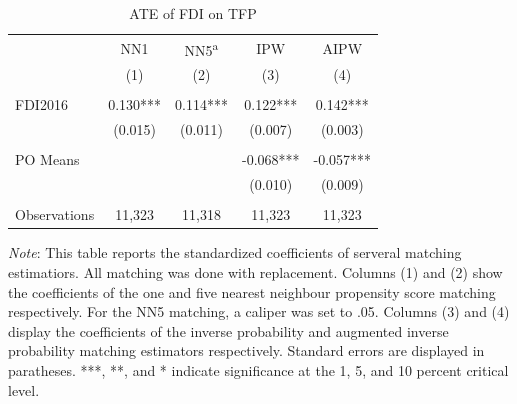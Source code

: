 \documentclass[a4paper,11pt]{scrartcl}
\begin{document}
\begin{table}[h!]
 	\centering
   	\caption{ATE of FDI on TFP}
   	\label{tab:mainresults}
\begin{threeparttable}
	
 \begin{tabular}{l*{4}{c}}
	\hline
	\hline
 			& NN1 & NN5\textsuperscript{a} & IPW & AIPW \\
 			& (1) & (2) & (3)  & (4) \\ \hline
 			&  &  &  &    \\
FDI2016 	& 0.130*** & 0.114*** & 0.122***  & 0.142***   \\
 			& (0.015) & (0.011) & (0.007) &   (0.003)  \\
 	&  &  &  &    \\
PO Means 	& & & -0.068*** &  -0.057*** \\
			&  &  & (0.010)  &  (0.009) \\
			&  &  &  &    \\
 Observations & 11,323 & 11,318 & 11,323 & 11,323 \\ 
 	\hline
 	\hline 
\end{tabular}

\begin{tablenotes}[flushleft]
      \footnotesize
\item \textit{Note}: %
This table reports the standardized coefficients of serveral matching estimatiors. All matching was done with replacement. Columns (1) and (2) show the coefficients of the one and five nearest neighbour propensity score matching respectively. For the NN5 matching, a caliper was set to .05. Columns (3) and (4) display the coefficients of the inverse probability and augmented inverse probability matching estimators respectively.  Standard errors are displayed in paratheses. ***, **, and * indicate significance at the 1, 5, and 10 percent critical level.

\end{tablenotes}

\end{threeparttable}
\end{table}
\end{document}
